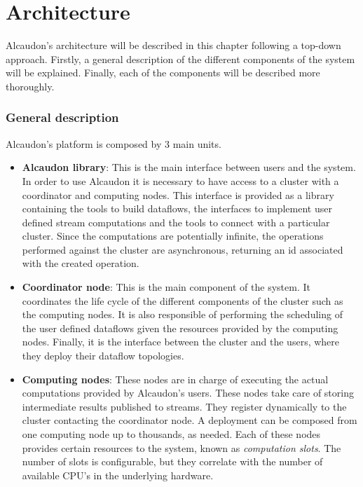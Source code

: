 \chapter{Architecture}
\label{chapter:architecture}

Alcaudon's architecture will be described in this chapter following a top-down
approach. Firstly, a general description of the different components of the system
will be explained. Finally, each of the components will be described more thoroughly.

\subsection{General description}

Alcaudon's platform is composed by 3 main units.

\begin{itemize}
\item \textbf{Alcaudon library}: This is the main interface between users
  and the system. In order to use Alcaudon it is necessary to have access to a
  cluster with a coordinator and computing nodes. This interface is provided as
  a library containing the tools to build dataflows, the interfaces to implement
  user defined stream computations and the tools to connect with a particular
  cluster. Since the computations are potentially infinite, the operations
  performed against the cluster are asynchronous, returning an id associated
  with the created operation.
\item \textbf{Coordinator node}: This is the main component of the system. It
  coordinates the life cycle of the different components of the cluster such as
  the computing nodes. It is also responsible of performing the scheduling of
  the user defined dataflows given the resources provided by the computing
  nodes. Finally, it is the interface between the cluster and the users, where
  they deploy their dataflow topologies.

\item \textbf{Computing nodes}: These nodes are in charge of executing the
  actual computations provided by Alcaudon's users. These nodes take care of
  storing intermediate results published to streams. They register dynamically
  to the cluster contacting the coordinator node. A deployment can be composed
  from one computing node up to thousands, as needed. Each of these nodes
  provides certain resources to the system, known as \textit{computation slots}.
  The number of slots is configurable, but they correlate with the number of
  available CPU's in the underlying hardware.
\end{itemize}


